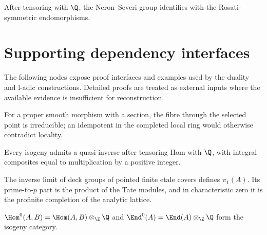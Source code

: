 \begin{remark}
\label{mumford-iv20-ns-rosati-symmetric}
After tensoring with $\Q$, the Neron--Severi group identifies with the
Rosati-symmetric endomorphisms.
\notready
\end{remark}

\section{Supporting dependency interfaces}
\label{mumford-IV-coverage-register}
The following nodes expose proof interfaces and examples used by the duality and
l-adic constructions.  Detailed proofs are treated as external inputs where
the available evidence is insufficient for reconstruction.

\begin{lemma}
\label{mumford-iv18-fiber-irreducibility-lemma}
For a proper smooth morphism with a section, the fibre through the selected
point is irreducible; an idempotent in the completed local ring would otherwise
contradict locality.
\notready
\end{lemma}

\begin{remark}
\label{mumford-iv18-isogeny-quasi-inverse}
Every isogeny admits a quasi-inverse after tensoring Hom with $\Q$, with
integral composites equal to multiplication by a positive integer.
\notready
\end{remark}

\begin{definition}
\label{mumford-iv18-fundamental-group-inverse-system}
The inverse limit of deck groups of pointed finite etale covers defines
$\pi_1(A)$.  Its prime-to-$p$ part is the product of the Tate modules, and in
characteristic zero it is the profinite completion of the analytic lattice.
\notready
\end{definition}

\begin{definition}
\label{mumford-iv19-hom-up-to-isogeny}
$\Hom^0(A,B)=\Hom(A,B)\otimes_\Z\Q$ and
$\End^0(A)=\End(A)\otimes_\Z\Q$ form the isogeny category.
\notready
\end{definition}

